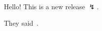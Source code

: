 \documentclass{exam}
\begin{document}
    Hello!
    This is a new release $\lightning$.
    

    They said~\cite{book1}.

    
    
\end{document}
